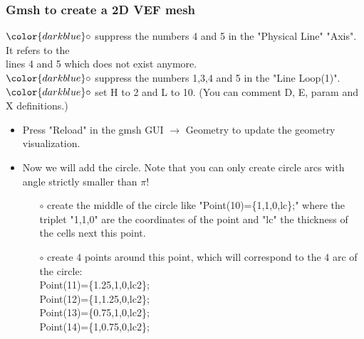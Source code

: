 \documentclass[10pt, hyperref={unicode=true,pdfusetitle, bookmarks=true,bookmarksnumbered=false,bookmarksopen=false, breaklinks=false,pdfborder={0 0 1},backref=true,colorlinks=true,linkcolor=darkblue,pageanchor}]{beamer}
\begin{document}
\begin{frame}
\frametitle{Gmsh to create a 2D VEF mesh}
\begin{block}{}

\hspace{1cm} $\color{darkblue}\circ$ {\small{ suppress the numbers 4 and 5 in the "Physical Line" "Axis". It refers to the \\
\hspace{1.4cm} lines 4 and 5 which does not exist anymore.}}\\
\hspace{1cm} $\color{darkblue}\circ$ {\small{ suppress the numbers 1,3,4 and 5 in the "Line Loop(1)".}}\\
\hspace{1cm} $\color{darkblue}\circ$ {\small{ set H to 2 and L to 10. (You can comment D, E, param and X definitions.)}}

\begin{itemize}
\item Press "Reload" in the gmsh GUI $\rightarrow$ Geometry to update the geometry visualization.
\item Now we will add the circle. Note that you can only create circle arcs with angle strictly smaller than $\pi$!
    \begin{itemize}
    \item [$\circ$] create the middle of the circle like "Point(10)=\{1,1,0,lc\};" where the triplet "1,1,0" are the coordinates of the point and "lc" the thickness of the cells next this point.
    \item [$\circ$] create 4 points around this point, which will correspond to the 4 arc of the circle: \\
Point(11)=\{1.25,1,0,lc2\};\\
Point(12)=\{1,1.25,0,lc2\};\\
Point(13)=\{0.75,1,0,lc2\};\\
Point(14)=\{1,0.75,0,lc2\};
    \end{itemize}

\end{itemize}

\end{block}
\end{frame}
\end{document}
